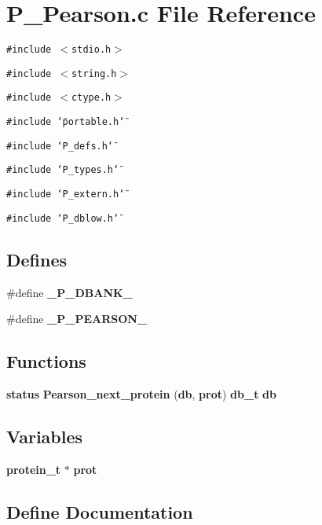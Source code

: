 \section{P\_\-Pearson.c File Reference}
\label{P__Pearson_8c}
{\tt \#include $<$stdio.h$>$}\par
{\tt \#include $<$string.h$>$}\par
{\tt \#include $<$ctype.h$>$}\par
{\tt \#include \char`\"{}portable.h\char`\"{}}\par
{\tt \#include \char`\"{}P\_\-defs.h\char`\"{}}\par
{\tt \#include \char`\"{}P\_\-types.h\char`\"{}}\par
{\tt \#include \char`\"{}P\_\-extern.h\char`\"{}}\par
{\tt \#include \char`\"{}P\_\-dblow.h\char`\"{}}\par
\subsection*{Defines}
\begin{CompactItemize}
\item 
\#define {\bf \_\-P\_\-DBANK\_\-}
\item 
\#define {\bf \_\-P\_\-PEARSON\_\-}
\end{CompactItemize}
\subsection*{Functions}
\begin{CompactItemize}
\item 
{\bf status} {\bf Pearson\_\-next\_\-protein} ({\bf db}, {\bf prot}) {\bf db\_\-t} {\bf db}
\end{CompactItemize}
\subsection*{Variables}
\begin{CompactItemize}
\item 
{\bf protein\_\-t} $\ast$ {\bf prot}
\end{CompactItemize}


\subsection{Define Documentation}
